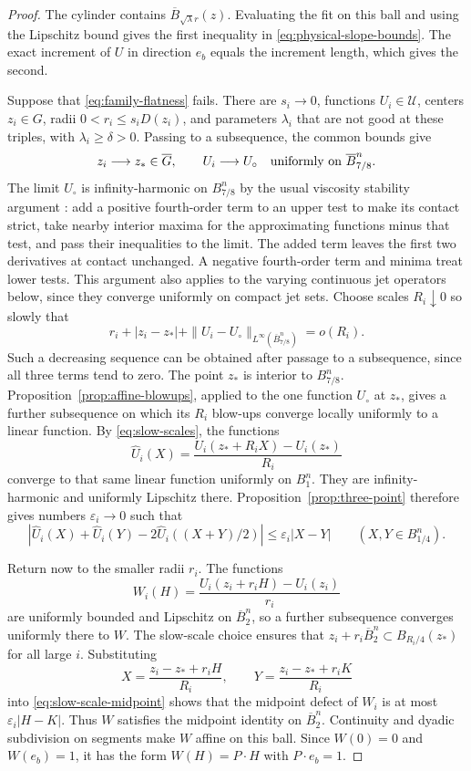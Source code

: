 \begin{proof}
The cylinder contains $\overline B_{\sqrt\lambda r}(z)$. Evaluating the fit on this ball and using the Lipschitz bound gives the first inequality in \eqref{eq:physical-slope-bounds}. The exact increment of $U$ in direction $e_b$ equals the increment length, which gives the second.

Suppose that \eqref{eq:family-flatness} fails. There are $s_i\to0$, functions $U_i\in\mathcal U$, centers $z_i\in G$, radii $0<r_i\le s_iD(z_i)$, and parameters $\lambda_i$ that are not good at these triples, with $\lambda_i\ge\delta>0$. Passing to a subsequence, the common bounds give
\[
  z_i\longrightarrow z_*\in\overline G,\qquad
  U_i\longrightarrow U_\circ
       \quad\hbox{uniformly on }\overline B_{7/8}^n.
\]
The limit $U_\circ$ is infinity-harmonic on $B_{7/8}^n$ by the usual viscosity stability argument \cite[Section~6]{CIL1992}: add a positive fourth-order term to an upper test to make its contact strict, take nearby interior maxima for the approximating functions minus that test, and pass their inequalities to the limit. The added term leaves the first two derivatives at contact unchanged. A negative fourth-order term and minima treat lower tests. This argument also applies to the varying continuous jet operators below, since they converge uniformly on compact jet sets. Choose scales $R_i\downarrow0$ so slowly that
\begin{equation}\label{eq:slow-scales}
  r_i+|z_i-z_*|+
    \|U_i-U_\circ\|_{L^\infty(\overline B_{7/8}^n)}=o(R_i).
\end{equation}
Such a decreasing sequence can be obtained after passage to a subsequence, since all three terms tend to zero. The point $z_*$ is interior to $B_{7/8}^n$. Proposition~\ref{prop:affine-blowups}, applied to the one function $U_\circ$ at $z_*$, gives a further subsequence on which its $R_i$ blow-ups converge locally uniformly to a linear function. By \eqref{eq:slow-scales}, the functions
\[
  \widehat U_i(X)=
    \frac{U_i(z_*+R_iX)-U_i(z_*)}{R_i}
\]
converge to that same linear function uniformly on $B_1^n$. They are infinity-harmonic and uniformly Lipschitz there. Proposition~\ref{prop:three-point} therefore gives numbers $\varepsilon_i\to0$ such that
\begin{equation}\label{eq:slow-scale-midpoint}
  |\widehat U_i(X)+\widehat U_i(Y)
       -2\widehat U_i((X+Y)/2)|\le\varepsilon_i|X-Y|
       \qquad (X,Y\in B_{1/4}^n).
\end{equation}

Return now to the smaller radii $r_i$. The functions
\[
  W_i(H)=\frac{U_i(z_i+r_iH)-U_i(z_i)}{r_i}
\]
are uniformly bounded and Lipschitz on $\overline B_2^n$, so a further subsequence converges uniformly there to $W$. The slow-scale choice ensures that $z_i+r_i\overline B_2^n\subset B_{R_i/4}(z_*)$ for all large $i$. Substituting
\[
  X=\frac{z_i-z_*+r_iH}{R_i},\qquad
  Y=\frac{z_i-z_*+r_iK}{R_i}
\]
into \eqref{eq:slow-scale-midpoint} shows that the midpoint defect of $W_i$ is at most $\varepsilon_i|H-K|$. Thus $W$ satisfies the midpoint identity on $\overline B_2^n$. Continuity and dyadic subdivision on segments make $W$ affine on this ball. Since $W(0)=0$ and $W(e_b)=1$, it has the form $W(H)=P\cdot H$ with $P\cdot e_b=1$.


\end{proof}
